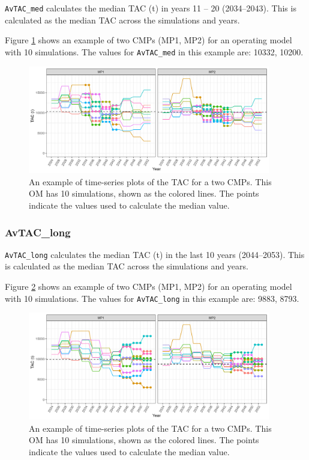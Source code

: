 \documentclass[
]{article}
\begin{document}
\texttt{AvTAC\_med} calculates the median TAC (t) in years 11 -- 20 (2034--2043). This is calculated as the median TAC across the simulations and years.

Figure \ref{fig:AvCmed} shows an example of two CMPs (MP1, MP2) for an operating model with 10 simulations. The values for \texttt{AvTAC\_med} in this example are: 10332, 10200.

\begin{figure}
\includegraphics[width=400px]{../../img/PMs/AvTAC_med} \caption{An example of time-series plots of the TAC for a two CMPs. This OM has 10 simulations, shown as the colored lines. The points indicate the values used to calculate the median value.}\label{fig:AvCmed}
\end{figure}

\hypertarget{avtac_long}{%
\subsubsection{AvTAC\_long}\label{avtac_long}}

\texttt{AvTAC\_long} calculates the median TAC (t) in the last 10 years (2044--2053). This is calculated as the median TAC across the simulations and years.

Figure \ref{fig:AvC30} shows an example of two CMPs (MP1, MP2) for an operating model with 10 simulations. The values for \texttt{AvTAC\_long} in this example are: 9883, 8793.

\begin{figure}
\includegraphics[width=400px]{../../img/PMs/AvTAC_long} \caption{An example of time-series plots of the TAC for a two CMPs. This OM has 10 simulations, shown as the colored lines. The points indicate the values used to calculate the median value.}\label{fig:AvC30}
\end{figure}
\end{document}
